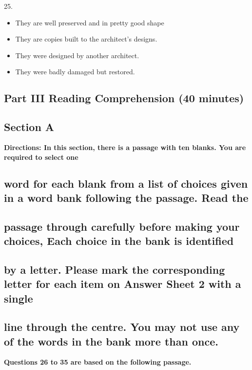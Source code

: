 \documentclass[UTF8,11pt]{ctexart}
\begin{document}
25.


\begin{itemize}[leftmargin=2em,itemsep=.2em,topsep=.4em]\item[A.] They are well preserved and in pretty good shape
\item[B.] They are copies built to the architect's designs.
\item[C.] They were designed by another architect.
\item[D.] They were badly damaged but restored.
\end{itemize}

\subsection*{\textbf{Part III} \textbf{Reading Comprehension} \textbf{(40 minutes)}}


\subsection*{\textbf{Section A}}


\textbf{Directions: In this section, there is a passage with ten blanks. You are required to select one}


\subsection*{\textbf{word for each blank from a list of choices given in a word bank following the passage. Read the}}


\subsection*{\textbf{passage through carefully before making your choices, Each choice in the bank} \textbf{is identified}}


\subsection*{\textbf{by a letter. Please mark the corresponding letter for each item on Answer Sheet 2 with a single}}


\subsection*{\textbf{line through the centre. You may not use any of the words in the bank more than once.}}


\textbf{Questions 26 to 35 are based on the following passage.}
\end{document}
